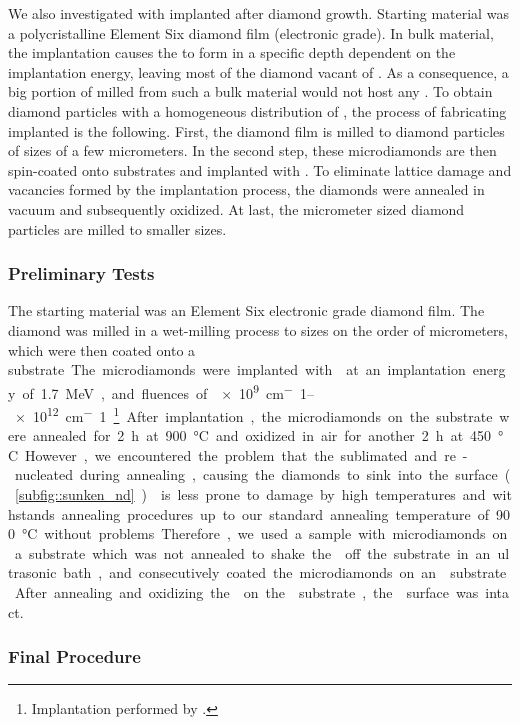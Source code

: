 	We also investigated \nds with \sivs implanted after diamond growth.
	Starting material was a polycristalline Element Six diamond film (electronic grade).
	In bulk material, the implantation causes the \sivs to form in a specific depth dependent on the implantation energy, leaving most of the diamond vacant of \sivs.
	As a consequence, a big portion of  \nds milled from such a bulk material would not host any \sivs.
	To obtain diamond particles with a homogeneous distribution of \sivs, the process of fabricating implanted \nds is the following.
	First, the diamond film is milled to diamond particles of sizes of a few micrometers.
	In the second step, these microdiamonds are then spin-coated onto \ir substrates and implanted with .
	To eliminate lattice damage  and vacancies formed by the implantation process, the diamonds were annealed in vacuum and subsequently oxidized.
	At last, the micrometer sized diamond particles are milled to smaller sizes.

	\subsubsection{Preliminary Tests}\label{subsubsec::preliminary_tests}

	The starting material was an Element Six electronic grade diamond film.
	The diamond was milled in a wet-milling process to sizes on the order of micrometers, which were then coated onto a \si substrate.
	The microdiamonds were implanted with  at an implantation energy of \SI{1.7}{MeV}, and fluences of \SIrange{e9}{e12}{cm^-1}\footnote{Implantation performed by \rogalla.}.
	After implantation, the microdiamonds on the \si substrate were annealed for \SI{2}{\hour} at \SI{900}{\celsius} and oxidized in air for another \SI{2}{\hour} at \SI{450}{\celsius}.
	However, we encountered the problem that the \si sublimated and re-nucleated during annealing, causing the diamonds to sink into the \si surface (\autoref{subfig::sunken_nd}).
	\Ir is less prone to damage by high temperatures and withstands annealing procedures up to our standard annealing temperature of \SI{900}{\celsius} without problems.
	Therefore, we used a sample with microdiamonds on a \si substrate which was not annealed to shake the \nds off the \si substrate in an ultrasonic bath, and consecutively coated the microdiamonds on an \ir substrate.
	After annealing and oxidizing the \nds on the \ir substrate, the \ir surface was intact.

	\subsubsection{Final Procedure}\label{subsubsec::final_procedure}

